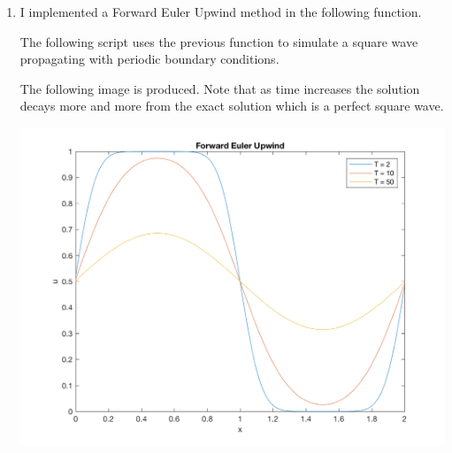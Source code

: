 \documentclass[11pt, oneside]{article}
\begin{document}
\begin{enumerate}
  \item %
    I implemented a Forward Euler Upwind method in the following \MATLAB{} function.
    
    The following script uses the previous function to simulate a square wave
    propagating with periodic boundary conditions.
    
    The following image is produced.
    Note that as time increases the solution decays more and more from the exact solution
    which is a perfect square wave.
    \begin{center}
      \includegraphics[scale=.8]{Figures/01_02.png}
    \end{center}


\end{enumerate}
\end{document}
